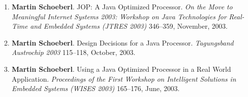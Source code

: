 \begin{enumerate}
\item {\bf Martin Schoeberl}.
 JOP: A Java Optimized Processor.
 \emph{On the Move to Meaningful Internet Systems 2003: Workshop on {J}ava Technologies for Real-Time and Embedded Systems (JTRES 2003)} 346--359, November, 2003.

\item {\bf Martin Schoeberl}.
 Design Decisions for a Java Processor.
 \emph{Tagungsband Austrochip 2003} 115--118, October, 2003.

\item {\bf Martin Schoeberl}.
 Using a Java Optimized Processor in a Real World Application.
 \emph{Proceedings of the First Workshop on Intelligent Solutions in Embedded Systems (WISES 2003)} 165--176, June, 2003.


\end{enumerate}


